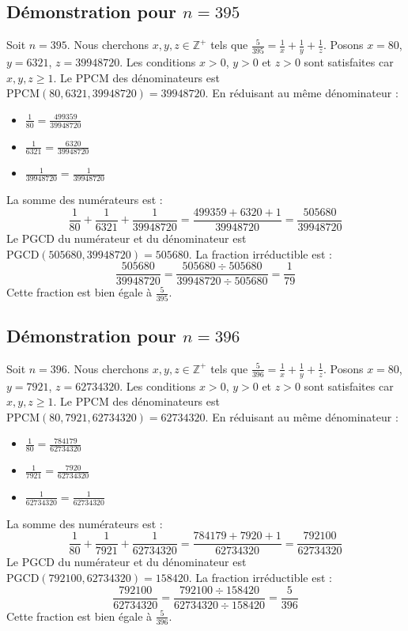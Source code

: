 \documentclass[11pt,a4paper]{article}
\begin{document}
\subsection{Démonstration pour $n = 395$}
Soit $n = 395$. Nous cherchons $x, y, z \in \mathbb{Z}^{+}$ tels que $\frac{5}{395} = \frac{1}{x} + \frac{1}{y} + \frac{1}{z}$.
Posons $x = 80$, $y = 6321$, $z = 39948720$.
Les conditions $x > 0$, $y > 0$ et $z > 0$ sont satisfaites car $x, y, z \geq 1$.
Le PPCM des dénominateurs est $\text{PPCM}(80, 6321, 39948720) = 39948720$.
En réduisant au même dénominateur :
\begin{itemize}
    \item $\frac{1}{80} = \frac{499359}{39948720}$
    \item $\frac{1}{6321} = \frac{6320}{39948720}$
    \item $\frac{1}{39948720} = \frac{1}{39948720}$
\end{itemize}
La somme des numérateurs est :
$$ \frac{1}{80} + \frac{1}{6321} + \frac{1}{39948720} = \frac{499359 + 6320 + 1}{39948720} = \frac{505680}{39948720} $$
Le PGCD du numérateur et du dénominateur est $\text{PGCD}(505680, 39948720) = 505680$.
La fraction irréductible est :
$$ \frac{505680}{39948720} = \frac{505680 \div 505680}{39948720 \div 505680} = \frac{1}{79} $$
Cette fraction est bien égale à $\frac{5}{395}$.

\subsection{Démonstration pour $n = 396$}
Soit $n = 396$. Nous cherchons $x, y, z \in \mathbb{Z}^{+}$ tels que $\frac{5}{396} = \frac{1}{x} + \frac{1}{y} + \frac{1}{z}$.
Posons $x = 80$, $y = 7921$, $z = 62734320$.
Les conditions $x > 0$, $y > 0$ et $z > 0$ sont satisfaites car $x, y, z \geq 1$.
Le PPCM des dénominateurs est $\text{PPCM}(80, 7921, 62734320) = 62734320$.
En réduisant au même dénominateur :
\begin{itemize}
    \item $\frac{1}{80} = \frac{784179}{62734320}$
    \item $\frac{1}{7921} = \frac{7920}{62734320}$
    \item $\frac{1}{62734320} = \frac{1}{62734320}$
\end{itemize}
La somme des numérateurs est :
$$ \frac{1}{80} + \frac{1}{7921} + \frac{1}{62734320} = \frac{784179 + 7920 + 1}{62734320} = \frac{792100}{62734320} $$
Le PGCD du numérateur et du dénominateur est $\text{PGCD}(792100, 62734320) = 158420$.
La fraction irréductible est :
$$ \frac{792100}{62734320} = \frac{792100 \div 158420}{62734320 \div 158420} = \frac{5}{396} $$
Cette fraction est bien égale à $\frac{5}{396}$.
\end{document}
